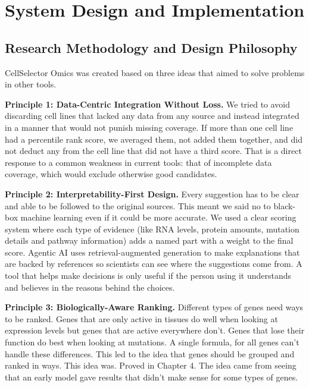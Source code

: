 \documentclass[author={Karen Coutinho, Ishaan Bhalla, Aman Raj, Dixit Kaloorani Malarmannan},
                supervisor={Dr. Daniel D'Andrea},
                degree={MSc},
                title={CellSelector Omics: A Multi-Omics Recommendation System for Cell Line Selection},
                subtitle={},
                type={},
                year={2026}]{dissertation}
\begin{document}

\chapter{System Design and Implementation}
\label{chap:execution}

\section{Research Methodology and Design Philosophy}

CellSelector Omics was created based on three ideas that aimed to solve problems in other tools.

{\bf Principle 1: Data-Centric Integration Without Loss.} We tried to avoid discarding cell lines that lacked any data from any source and instead integrated in a manner that would not punish missing coverage. If more than one cell line had a percentile rank score, we averaged them, not added them together, and did not deduct any from the cell line that did not have a third score. That is a direct response to a common weakness in current tools: that of incomplete data coverage, which would exclude otherwise good candidates.

{\bf Principle 2: Interpretability-First Design.} Every suggestion has to be clear and able to be followed to the original sources. This meant we said no to black-box machine learning even if it could be more accurate. We used a clear scoring system where each type of evidence (like RNA levels, protein amounts, mutation details and pathway information) adds a named part with a weight to the final score. Agentic AI uses retrieval-augmented generation to make explanations that are backed by references so scientists can see where the suggestions come from. A tool that helps make decisions is only useful if the person using it understands and believes in the reasons behind the choices.


{\bf Principle 3: Biologically-Aware Ranking.} Different types of genes need ways to be ranked. Genes that are only active in tissues do well when looking at expression levels but genes that are active everywhere don't. Genes that lose their function do best when looking at mutations. A single formula, for all genes can't handle these differences. This led to the idea that genes should be grouped and ranked in ways. This idea was. Proved in Chapter 4. The idea came from seeing that an early model gave results that didn't make sense for some types of genes.
\end{document}

